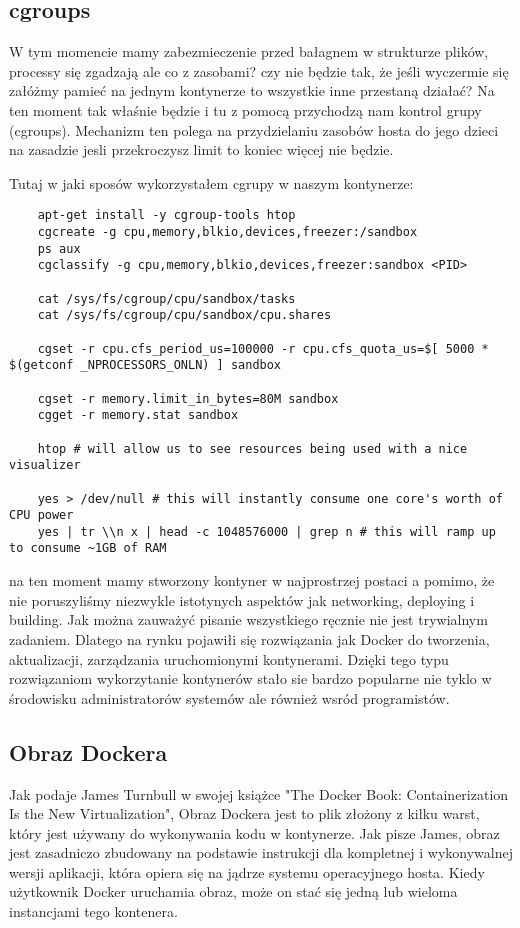 \subsection{cgroups}
W tym momencie mamy zabezmieczenie przed bałagnem w strukturze plików, processy się zgadzają ale co z zasobami? czy nie będzie tak, że jeśli wyczermie się załóżmy pamieć na jednym kontynerze to wszystkie inne przestaną działać? Na ten moment tak właśnie będzie i tu z pomocą przychodzą nam kontrol grupy (cgroups). Mechanizm ten polega na przydzielaniu zasobów hosta do jego dzieci na zasadzie jesli przekroczysz limit to koniec więcej nie będzie. 

Tutaj w jaki sposów wykorzystałem cgrupy w naszym kontynerze: 

\begin{lstlisting}
    apt-get install -y cgroup-tools htop
    cgcreate -g cpu,memory,blkio,devices,freezer:/sandbox
    ps aux 
    cgclassify -g cpu,memory,blkio,devices,freezer:sandbox <PID>

    cat /sys/fs/cgroup/cpu/sandbox/tasks
    cat /sys/fs/cgroup/cpu/sandbox/cpu.shares

    cgset -r cpu.cfs_period_us=100000 -r cpu.cfs_quota_us=$[ 5000 * $(getconf _NPROCESSORS_ONLN) ] sandbox

    cgset -r memory.limit_in_bytes=80M sandbox
    cgget -r memory.stat sandbox

    htop # will allow us to see resources being used with a nice visualizer

    yes > /dev/null # this will instantly consume one core's worth of CPU power
    yes | tr \\n x | head -c 1048576000 | grep n # this will ramp up to consume ~1GB of RAM
\end{lstlisting}
na ten moment mamy stworzony kontyner w najprostrzej postaci a pomimo, że nie poruszyliśmy niezwykle istotynych aspektów jak networking, deploying i building. 
Jak można zauważyć pisanie wszystkiego ręcznie nie jest trywialnym zadaniem. Dlatego na rynku pojawiłi się rozwiązania jak Docker do tworzenia, aktualizacji, zarządzania uruchomionymi kontynerami. Dzięki tego typu rozwiązaniom wykorzytanie kontynerów stało sie bardzo popularne nie tyklo w środowisku administratorów systemów ale również wsród programistów. 
\subsection{Obraz Dockera}
Jak podaje James Turnbull w swojej książce "The Docker Book: Containerization Is the New Virtualization", Obraz Dockera jest to plik złożony z kilku warst, który jest używany do wykonywania kodu w kontynerze. Jak pisze James, obraz jest zasadniczo zbudowany na podstawie instrukcji dla kompletnej i wykonywalnej wersji aplikacji, która opiera się na jądrze systemu operacyjnego hosta. Kiedy użytkownik Docker uruchamia obraz, może on stać się jedną lub wieloma instancjami tego kontenera.
